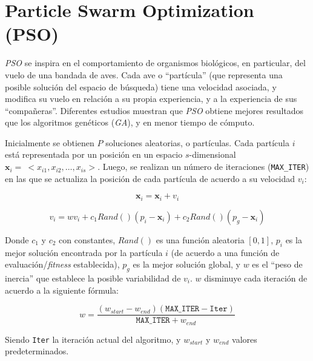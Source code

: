 \section{Particle Swarm Optimization (PSO)}

\emph{PSO} se inspira en el comportamiento de organismos biológicos, en particular, del vuelo de una bandada de aves. Cada ave o ``partícula'' (que representa una posible solución del espacio de búsqueda) tiene una velocidad asociada, y modifica su vuelo en relación a su propia experiencia, y a la experiencia de sus ``compañeras''. Diferentes estudios muestran que \emph{PSO} obtiene mejores resultados que los algoritmos genéticos (\emph{GA}), y en menor tiempo de cómputo.

Inicialmente se obtienen $P$ soluciones aleatorias, o partículas. Cada partícula $i$ está representada por un posición en un espacio $s$-dimensional \linebreak $\textbf{x}_i =\ <x_{i1},x_{i2},\dots,x_{is}>$. Luego, se realizan un número de iteraciones (\texttt{MAX\_ITER}) en las que se actualiza la posición de cada partícula de acuerdo a su velocidad $v_i$:

$$\textbf{x}_i = \textbf{x}_i + v_i$$

$$v_i = w v_i + c_1 Rand() (p_i - \textbf{x}_i) +  c_2 Rand() (p_g - \textbf{x}_i)$$

Donde $c_1$ y $c_2$ con constantes, $Rand()$ es una función aleatoria $[0,1]$, $p_i$ es la mejor solución encontrada por la partícula $i$ (de acuerdo a una función de evaluación/\emph{fitness} establecida), $p_g$ es la mejor solución global, y $w$ es el ``peso de inercia'' que establece la posible variabilidad de $v_i$. $w$ disminuye cada iteración de acuerdo a la siguiente fórmula:

$$w = \frac{(w_{start} - w_{end})(\texttt{MAX\_ITER} - \texttt{Iter})}{\texttt{MAX\_ITER} + w_{end}}$$

Siendo \texttt{Iter} la iteración actual del algoritmo, y $w_{start}$ y $w_{end}$ valores predeterminados.
